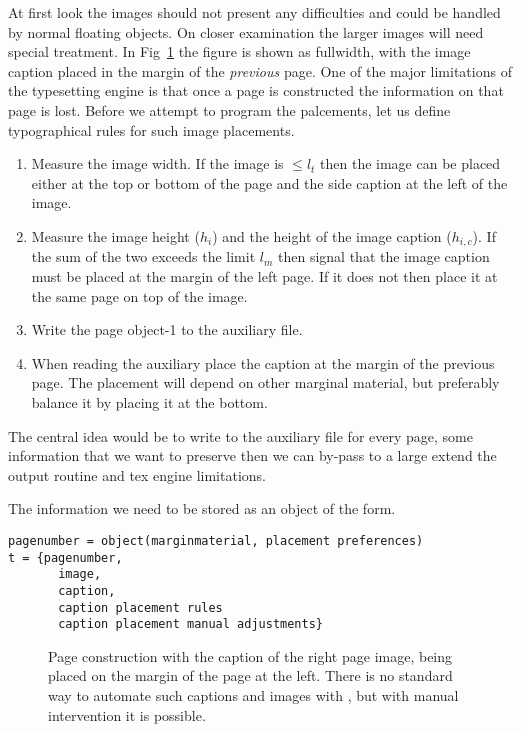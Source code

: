 At first look the images should not present any difficulties and could be handled by normal
floating \latexe objects. On closer examination the larger images will need special treatment. In Fig~\ref{unequal}
the figure is shown as fullwidth, with the image caption placed in the margin of the \emph{previous} page. One of the major limitations of the \tex typesetting engine is that once a page is constructed the information on that page is lost. Before we attempt to program the palcements, let us define typographical rules for such image placements.

\begin{enumerate}
\item Measure the image width. If the image is $\le l_t$ then the image can be placed either at the top
         or bottom of the page and the side caption at the left of the image.
\item Measure the image height ($h_i$) and the height of the image caption ($h_{i,c}$). If the sum of the two exceeds the limit $l_m$ then signal that the image caption must be placed at the margin of the left page. If it does not then place it at the same page on top of the image.

\item Write the page object-1 to the auxiliary file.

\item When reading the auxiliary place the caption at the margin of the previous page. The placement will
depend on other marginal material, but preferably balance it by placing it at the bottom. 
\end{enumerate}
  
The central idea would be to write to the auxiliary file for every page, some information that we want to preserve
then we can by-pass to a large extend the output routine and tex engine limitations.

The information we need to be stored as an object of the form.

\begin{verbatim}
pagenumber = object(marginmaterial, placement preferences)
t = {pagenumber,
       image,
       caption,
       caption placement rules
       caption placement manual adjustments}
\end{verbatim}
 
\begin{figure}[tbp]
\caption{Page construction with the caption of the right page image, being placed on the margin of the page at the left. There is no standard way to automate such captions and images with \latexe, but with manual
intervention it is possible.}
\label{unequal}
\end{figure}

